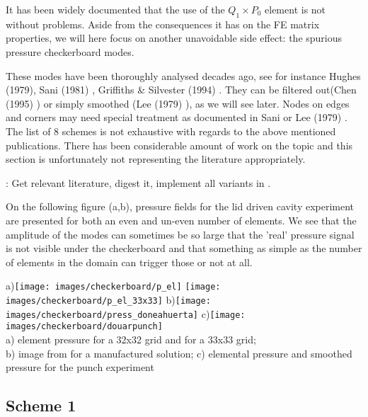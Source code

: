
It has been widely documented that the use of the $Q_1 \times P_0$ element is 
not without problems. Aside from the 
consequences it has on the FE matrix properties, we will here focus on another unavoidable side effect: 
the spurious pressure checkerboard modes. 

These modes have been thoroughly analysed decades ago, see for instance
Hughes \etal (1979)\cite{hulb79}, 
Sani \etal (1981) \cite{sagl81a,sagl81b},
Griffiths \& Silvester (1994) \cite{grsi94}.
They can be filtered out(Chen (1995)  \cite{chpc95}) 
or simply smoothed (Lee \etal (1979) \cite{legs79}), as we will see later.
Nodes on edges and corners may need special treatment as documented in Sani \etal \cite{sagl81a} or
Lee \etal (1979) \cite{legs79}.
The list of 8 schemes is not exhaustive with regards to the above mentioned publications. 
There has been considerable amount of work on the topic and this section is 
unfortunately not representing the literature appropriately.

\mscthesis: Get relevant literature, digest it, implement all variants in .

On the following figure (a,b), pressure fields for the lid driven cavity experiment 
are presented for both an even and un-even number of elements. We see that 
the amplitude of the modes can sometimes be so large that the 'real' pressure signal is 
not visible under the checkerboard and that something as simple as the number of elements in the 
domain can trigger those or not at all.

\begin{center}
a)\texttt{[image: images/checkerboard/p\_el]}
\texttt{[image: images/checkerboard/p\_el\_33x33]}
b)\texttt{[image: images/checkerboard/press\_doneahuerta]}
c)\texttt{[image: images/checkerboard/douarpunch]}\\
{\captionfont a) element pressure for a 32x32 grid and for a 33x33 grid;\\ 
b) image from \cite[p307]{dohu03} for a manufactured solution;
c) elemental pressure and smoothed pressure for the punch experiment \cite{thfb08}}
\end{center}

\subsection{Scheme 1}

